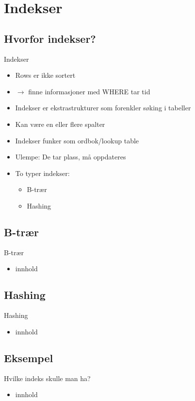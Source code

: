 \section{Indekser}
\subsection*{Hvorfor indekser?}
\begin{frame}{Indekser}
    \begin{itemize}[<+->]
        \item Rows er ikke sortert
        \item $\rightarrow$ finne informasjoner med WHERE tar tid
        \item Indekser er ekstrastrukturer som forenkler søking i tabeller
        \item Kan være en eller flere spalter
        \item Indekser funker som ordbok/lookup table
        \item Ulempe: De tar plass, må oppdateres
        \item To typer indekser:
            \begin{itemize}
                \item B-trær
                \item Hashing
            \end{itemize}
    \end{itemize}
\end{frame}

\subsection*{B-trær}
\begin{frame}{B-trær}
    \begin{itemize}
        \item innhold
    \end{itemize}
\end{frame}

\subsection*{Hashing}
\begin{frame}{Hashing}
    \begin{itemize}
        \item innhold
    \end{itemize}
\end{frame}

\subsection*{Eksempel}
\begin{frame}{Hvilke indeks skulle man ha?}
    \begin{itemize}
        \item innhold
    \end{itemize}
\end{frame}

